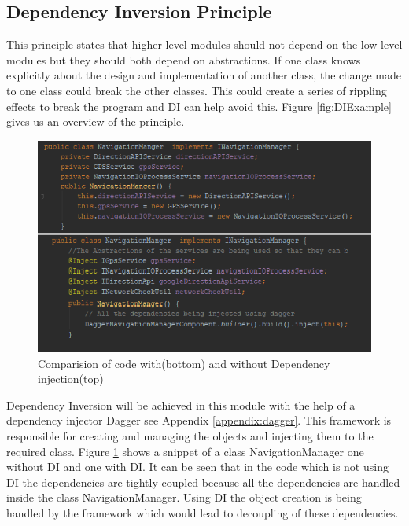\subsection{Dependency Inversion Principle}
    This principle states that higher level modules should not depend on 
    the low-level modules but they should both depend on abstractions. If one class 
    knows explicitly about the design and implementation of another class,
    the change made to one class could break the other classes. This could
    create a series of rippling effects to break the program and DI can help avoid this. Figure
    \ref{fig:DIExample} gives us an overview of the principle.

    \begin{figure}[htbp!]
        \centering \includegraphics{grafiken/di_compare.png}
        \caption{Comparision of code with(bottom) and without Dependency injection(top)}
        \label{fig:DIComparision}
    \end{figure}

    \par
        Dependency Inversion will be achieved in this module with the help of a dependency
        injector Dagger \cite{SquareDagger} 
        see Appendix \ref{appendix:dagger}. 
        This framework is responsible for creating and managing the 
        objects and injecting them to the required
        class. 
        Figure \ref{fig:DIComparision} shows a snippet of a class 
        NavigationManager one without DI and one with DI.
        It can be seen that in the code which is not using 
        DI the dependencies are tightly coupled because all the
        dependencies are handled inside the class NavigationManager.
        Using DI the object creation is being handled by the
        framework which would lead to decoupling of these dependencies.

    
        